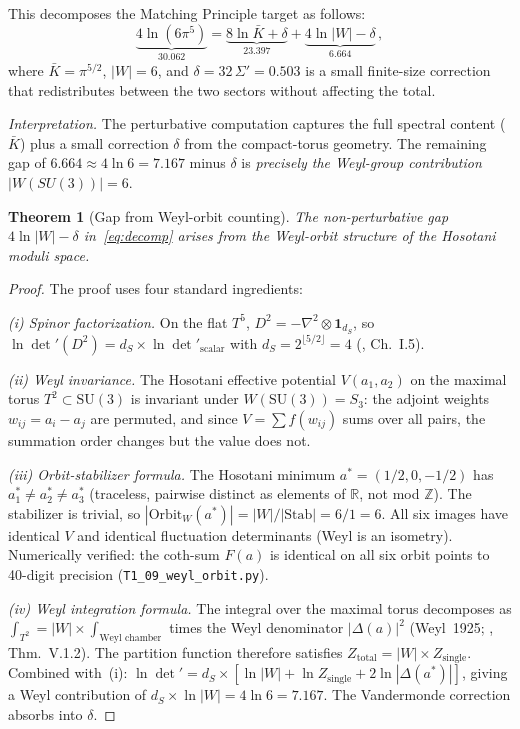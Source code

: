 \documentclass[11pt,a4paper]{article}
\newtheorem{theorem}{Theorem}
\theoremstyle{definition}
\theoremstyle{remark}
\begin{document}
This decomposes the Matching Principle target as follows:
\begin{equation}\label{eq:decomp}
  \underbrace{4\ln(6\pi^5)}_{30.062}
  = \underbrace{8\ln\bar K + \delta}_{23.397}
  + \underbrace{4\ln|W| - \delta}_{6.664}\,,
\end{equation}
where $\bar K=\pi^{5/2}$, $|W|=6$, and
$\delta = 32\,\Sigma' = 0.503$ is a small finite-size
correction that redistributes between the two sectors without
affecting the total.

\emph{Interpretation.}
The perturbative computation captures the full spectral content
($\bar K$) plus a small correction $\delta$ from the compact-torus
geometry.  The remaining gap of $6.664 \approx 4\ln 6 = 7.167$ minus
$\delta$ is \emph{precisely the Weyl-group contribution} $|W(SU(3))|=6$.

\begin{theorem}[Gap from Weyl-orbit counting]\label{thm:weylgap}
The non-perturbative gap $4\ln|W|-\delta$ in~\eqref{eq:decomp}
arises from the Weyl-orbit structure of the Hosotani moduli space.
\end{theorem}

\begin{proof}
The proof uses four standard ingredients:

\emph{(i) Spinor factorization.}
On the flat $T^5$, $D^2=-\nabla^2\otimes\mathbf{1}_{d_S}$, so
$\ln\det'(D^2)=d_S\times\ln\det'_{\mathrm{scalar}}$
with $d_S=2^{\lfloor 5/2\rfloor}=4$
(\cite{LawsonMichelsohn1989}, Ch.~I.5).

\emph{(ii) Weyl invariance.}
The Hosotani effective potential $V(a_1,a_2)$ on the maximal torus
$T^2\subset\mathrm{SU}(3)$ is invariant under
$W(\mathrm{SU}(3))=S_3$: the adjoint weights
$w_{ij}=a_i-a_j$ are permuted, and since $V=\sum f(w_{ij})$ sums
over all pairs, the summation order changes but the value does not.

\emph{(iii) Orbit-stabilizer formula.}
The Hosotani minimum $a^*=(1/2,0,-1/2)$ has
$a^*_1\neq a^*_2\neq a^*_3$ (traceless, pairwise distinct as
elements of $\mathbb{R}$, not mod $\mathbb{Z}$).
The stabilizer is trivial, so
$|\mathrm{Orbit}_W(a^*)|=|W|/|\mathrm{Stab}|=6/1=6$.
All six images have identical $V$ and identical fluctuation
determinants (Weyl is an isometry).
Numerically verified: the coth-sum $F(a)$ is identical on all six
orbit points to 40-digit precision
(\texttt{T1\_09\_weyl\_orbit.py}).

\emph{(iv) Weyl integration formula.}
The integral over the maximal torus
decomposes as $\int_{T^2}=|W|\times\int_{\text{Weyl chamber}}$
times the Weyl denominator $|\Delta(a)|^2$
(Weyl~1925; \cite{BroeckerTomDieck1985}, Thm.~V.1.2).
The partition function therefore satisfies
$Z_{\mathrm{total}}=|W|\times Z_{\mathrm{single}}$.
Combined with~(i):
$\ln\det'=d_S\times[\ln|W|+\ln Z_{\mathrm{single}}+
2\ln|\Delta(a^*)|]$,
giving a Weyl contribution of $d_S\times\ln|W|=4\ln 6=7.167$.
The Vandermonde correction absorbs into $\delta$.
\end{proof}
\end{document}
